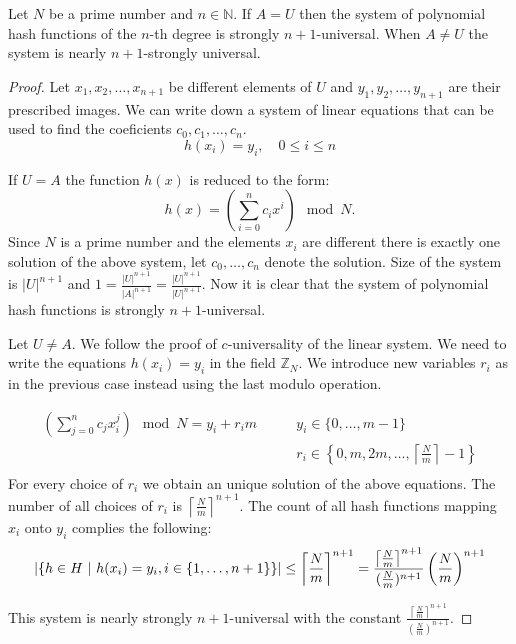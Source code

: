 \begin{remark}
Let $N$ be a prime number and $n \in \mathbb{N}$. If $A = U$ then the system of polynomial hash functions of the $n$-th degree is strongly $n + 1$-universal. When $A \neq U$ the system is nearly $n + 1$-strongly universal.
\end{remark}
\begin{proof}
Let $x_1, x_2, \dots, x_{n+1}$ be different elements of $U$ and $y_1, y_2, \dots, y_{n+1}$ are their prescribed images. We can write down a system of linear equations that can be used to find the coeficients $c_0, c_1, \dots, c_n$.
\[ 
h(x_i) = y_i, \quad 0 \leq i \leq n 
\]

If $U = A$ the function $h(x)$ is reduced to the form: \[ h(x) = \left( \displaystyle \sum_{i=0}^{n} c_i x^i \right) \mod N \textit{.} \] Since $N$ is a prime number and the elements $x_i$ are different there is exactly one solution of the above system, let $c_0, \dots, c_n$ denote the solution. Size of the system is ${|U|}^{n+1}$ and $1 = \frac{|U| ^ {n + 1}}{|A|^{n + 1}} = \frac{|U| ^ {n + 1}}{|U|^{n + 1}}$. Now it is clear that the system of polynomial hash functions is strongly $n + 1$-universal.

Let $U \neq A$. We follow the proof of $c$-universality of the linear system. We need to write the equations $h(x_i) = y_i$ in the field $\mathbb{Z}_N$. We introduce new variables $r_i$ as in the previous case instead using the last modulo operation.

\begin{displaymath}
\begin{split}
\left(\displaystyle \sum_{j=0}^{n} c_j x_{i}^{j} \right) \mod N = {y}_i + {r_i}{m} \qquad 
 & y_i \in \{0, \dots, m - 1 \} \\
 & r_i \in \left\{0, m, 2m, \dots, \left\lceil \frac{N}{m} \right\rceil - 1 \right\} \\
\end{split}
\end{displaymath}
For every choice of $r_i$ we obtain an unique solution of the above equations. The number of all choices of $r_i$ is ${\left\lceil \frac{N}{m} \right\rceil}^{n + 1}$. The count of all hash functions mapping $x_i$ onto $y_i$ complies the following:
\begin{displaymath}
|\{h \in H \ | \  h(x_i) = y_i, i \in \{1, \dots, n + 1\}\}| \leq {\left\lceil \frac{N}{m} \right\rceil}^{n + 1} = \frac{{\left\lceil \frac{N}{m} \right\rceil}^{n + 1}}{(\frac{N}{m})^{n+1}}\left(\frac{N}{m}\right)^{n+1}
\end{displaymath}

This system is nearly strongly $n+1$-universal with the constant $\frac{{\left\lceil \frac{N}{m} \right\rceil}^{n + 1}}{(\frac{N}{m})^{n+1}}$.
\end{proof}


